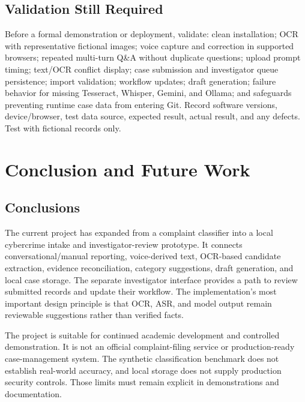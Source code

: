 \documentclass[12pt,a4paper,oneside]{report}
\begin{document}
\section{Validation Still Required}
Before a formal demonstration or deployment, validate: clean installation; OCR with representative fictional images; voice capture and correction in supported browsers; repeated multi-turn Q\&A without duplicate questions; upload prompt timing; text/OCR conflict display; case submission and investigator queue persistence; import validation; workflow updates; draft generation; failure behavior for missing Tesseract, Whisper, Gemini, and Ollama; and safeguards preventing runtime case data from entering Git. Record software versions, device/browser, test data source, expected result, actual result, and any defects. Test with fictional records only.\par\medskip
\clearpage\chapter{Conclusion and Future Work}
\section{Conclusions}
The current project has expanded from a complaint classifier into a local cybercrime intake and investigator-review prototype. It connects conversational/manual reporting, voice-derived text, OCR-based candidate extraction, evidence reconciliation, category suggestions, draft generation, and local case storage. The separate investigator interface provides a path to review submitted records and update their workflow. The implementation's most important design principle is that OCR, ASR, and model output remain reviewable suggestions rather than verified facts.\par\medskip
The project is suitable for continued academic development and controlled demonstration. It is not an official complaint-filing service or production-ready case-management system. The synthetic classification benchmark does not establish real-world accuracy, and local storage does not supply production security controls. Those limits must remain explicit in demonstrations and documentation.\par\medskip
\end{document}
